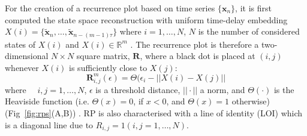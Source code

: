\documentclass[fleqn,10pt]{wlscirep}
\begin{document}
For the creation of a recurrence plot based on time series 
$\{ \boldsymbol{x}_n \}$, it is first computed the state space 
reconstruction with uniform time-delay embedding 
$X(i)=\{ \boldsymbol{ \tilde{x} }_n, \dots,  
\boldsymbol{ \tilde{x} }_{n -(m-1)\tau} \}$
where $i=1,\dots,N$, $N$ is the number of considered states of $X(i)$ 
and $X(i) \in \mathbb{R}^m$ \cite{eckmann1987}.
The recurrence plot is therefore a two-dimensional $N \times N$ square 
matrix, $\mathbf{R}$, where a black dot is placed at $(i,j)$ 
whenever $X(i)$ is sufficiently close to $X(j)$: 
\begin{equation}
\mathbf{R}^{m}_{i,j} (\epsilon) = \Theta ( \epsilon_i - || X(i) - X(j) ||
\end{equation}
where $\quad i,j=1,\dots,N$, $\epsilon$ is a threshold distance, 
$|| \cdotp ||$ a norm, and $\Theta(\cdotp)$ is the Heaviside 
function (i.e. $\Theta(x)=0$, if $x<0$, and $\Theta(x)=1$ otherwise) 
(Fig~\ref{fig:rps}(A,B)) \cite{eckmann1987, marwan2007,marwan2015}.
RP is also characterised with a line of identity (LOI) which is a  
diagonal line due to $ R_{i,j}=1 (i,j=1,\dots,N)$. 


\end{document}
